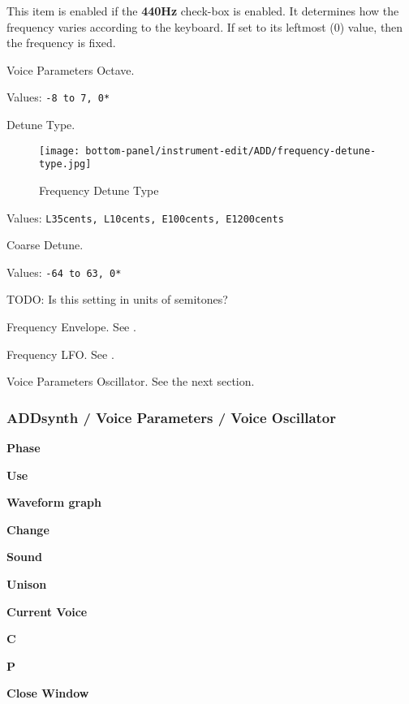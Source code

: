    This item is enabled if the \textbf{440Hz} check-box is enabled.
   It determines how the frequency varies according to the 
   keyboard.  If set to its leftmost (0) value, then the frequency is fixed.

   Voice Parameters Octave.

   Values: \texttt{-8 to 7, 0*}

%

   Detune Type.

\begin{figure}[H]
   \centering 
   \texttt{[image: bottom-panel/instrument-edit/ADD/frequency-detune-type.jpg]}
   \caption{Frequency Detune Type}
   \label{fig:frequency_detune_tYpe}
\end{figure}

   Values: \texttt{L35cents, L10cents, E100cents, E1200cents}

   Coarse Detune.

   Values: \texttt{-64 to 63, 0*}

   TODO: Is this setting in units of semitones?

   Frequency Envelope.
   See .

   Frequency LFO.
   See .

   Voice Parameters Oscillator.
   See the next section.

\subsubsection{ADDsynth / Voice Parameters / Voice Oscillator}
\label{subsubsec:addsynth_voice_parameters_oscillator}

   \begin{enumber}
      \item \textbf{Phase}
      \item \textbf{Use}
      \item \textbf{Waveform graph}
      \item \textbf{Change}
      \item \textbf{Sound}
      \item \textbf{Unison}
      \item \textbf{Current Voice}
      \item \textbf{C}
      \item \textbf{P}
      \item \textbf{Close Window}
   \end{enumber}

